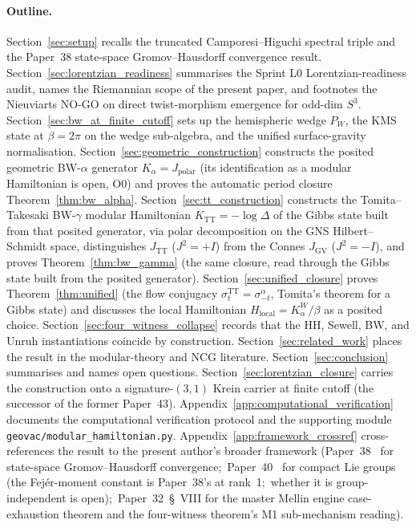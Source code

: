 \documentclass[11pt,a4paper]{article}
\theoremstyle{plain}
\theoremstyle{definition}
\newcommand{\sthree}{S^{3}}
\newcommand{\TT}{\mathrm{TT}}
\begin{document}
\paragraph{Outline.}
Section~\ref{sec:setup} recalls the truncated Camporesi--Higuchi
spectral triple and the Paper~38 state-space Gromov--Hausdorff convergence result.
Section~\ref{sec:lorentzian_readiness} summarises the Sprint L0
Lorentzian-readiness audit, names the Riemannian scope of the present
paper, and footnotes the Nieuviarts NO-GO on direct twist-morphism
emergence for odd-dim $\sthree$. Section~\ref{sec:bw_at_finite_cutoff}
sets up the hemispheric wedge $P_W$, the KMS state at $\beta = 2\pi$
on the wedge sub-algebra, and the unified surface-gravity normalisation.
Section~\ref{sec:geometric_construction} constructs the posited geometric
BW-$\alpha$ generator $K_\alpha = J_{\mathrm{polar}}$ (its
identification as a modular Hamiltonian is open, O0) and
proves the automatic period closure Theorem~\ref{thm:bw_alpha}.
Section~\ref{sec:tt_construction} constructs the Tomita--Takesaki
BW-$\gamma$ modular Hamiltonian $K_{\TT} = -\log \Delta$ of the Gibbs
state built from that posited generator, via polar
decomposition on the GNS Hilbert--Schmidt space, distinguishes
$J_{\TT}$ ($J^2 = +I$) from the Connes $J_{\mathrm{GV}}$ ($J^2 = -I$),
and proves Theorem~\ref{thm:bw_gamma} (the same closure, read through
the Gibbs state built from the posited generator).
Section~\ref{sec:unified_closure} proves
Theorem~\ref{thm:unified} (the flow conjugacy $\sigma_t^{\TT} =
\sigma_{-t}^{\alpha}$, Tomita's theorem for a Gibbs state) and
discusses the local Hamiltonian $H_{\mathrm{local}} = K_\alpha^W /
\beta$ as a posited choice.
Section~\ref{sec:four_witness_collapse} records that the HH, Sewell,
BW, and Unruh instantiations coincide by construction. Section~\ref{sec:related_work} places the result in the
modular-theory and NCG literature. Section~\ref{sec:conclusion}
summarises and names open questions.
Section~\ref{sec:lorentzian_closure} carries the construction onto a
signature-$(3, 1)$ Krein carrier at finite cutoff (the successor of the
former Paper~43).
Appendix~\ref{app:computational_verification} documents the
computational verification protocol and the supporting module
\texttt{geovac/modular\_hamiltonian.py}.
Appendix~\ref{app:framework_crossref} cross-references the result to
the present author's broader framework
(Paper~38~\cite{paper38} for state-space Gromov--Hausdorff convergence;\
Paper~40~\cite{paper40_unified} for compact Lie groups (the Fej\'er-moment
constant is Paper~38's at rank~1;\ whether it is group-independent is open);\ Paper~32~\S~VIII for the master Mellin engine
case-exhaustion theorem and the four-witness theorem's M1
sub-mechanism reading).
\end{document}
